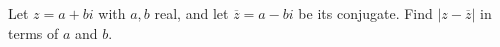Let $z=a+bi$ with $a,b$ real, and let $\overline z=a-bi$ be its conjugate. Find $\left|z-\overline z\right|$ in terms of $a$ and $b$.

